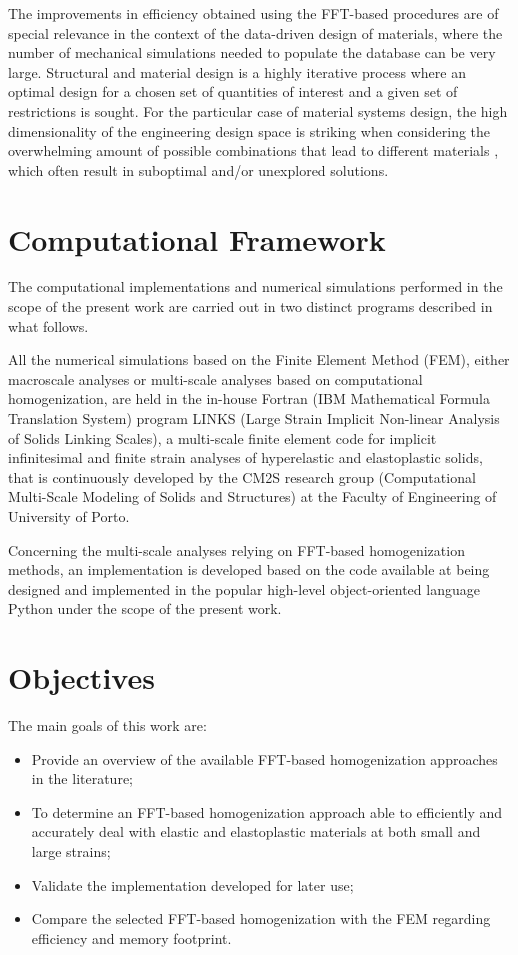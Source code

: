 The improvements in efficiency obtained using the FFT-based procedures are of special relevance in the context of the data-driven design of materials, where the number of mechanical simulations needed to populate the database can be very large.
Structural and material design is a highly iterative process where an optimal design for a chosen set of quantities of interest and a given set of restrictions is sought.
For the particular case of material systems design, the high dimensionality of the engineering design space is striking when considering the overwhelming amount of possible combinations that lead to different materials \citep{bessa_framework_2017}, which often result in suboptimal and/or unexplored solutions.

\section{Computational Framework}

The computational implementations and numerical simulations performed in the scope of the present work are carried out in two distinct programs described in what follows.

All the numerical simulations based on the Finite Element Method (FEM), either macroscale analyses or multi-scale analyses based on computational homogenization, are held in the in-house Fortran (IBM Mathematical Formula Translation System) program LINKS (Large Strain Implicit Non-linear Analysis of Solids Linking Scales), a multi-scale finite element code for implicit infinitesimal and finite strain analyses of hyperelastic and elastoplastic solids, that is continuously developed by the CM2S research group (Computational Multi-Scale Modeling of Solids and Structures) at the Faculty of Engineering of University of Porto.

Concerning the multi-scale analyses relying on FFT-based homogenization methods, an implementation is developed based on the code available at \cite{de_geus_notitle_nodate} being designed and implemented in the popular high-level object-oriented language Python under the scope of the present work.

\section{Objectives}

The main goals of this work are:
\begin{itemize}
    \item Provide an overview of the available FFT-based homogenization approaches in the literature;
    \item To determine an FFT-based homogenization approach able to efficiently and accurately deal with elastic and elastoplastic materials at both small and large strains;
    \item Validate the implementation developed for later use;
    \item Compare the selected FFT-based homogenization with the FEM regarding efficiency and memory footprint.
\end{itemize}


